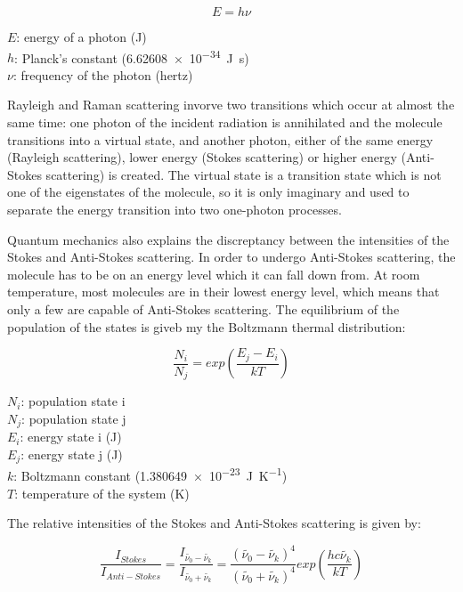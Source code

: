 \begin{equation}
    E = h \nu
\end{equation}

\( E\): energy of a photon (\unit{\joule})\\
\( h\): Planck's constant (\SI{6.62608e-34}{\joule\second})\\
\(\nu\): frequency of the photon (\unit{hertz})

\bigskip

Rayleigh and Raman scattering invorve two transitions which occur at almost the same time: one photon of the incident radiation is annihilated and the molecule transitions into a virtual state, and another photon, either of the same energy (Rayleigh scattering), lower energy (Stokes scattering) or higher energy (Anti-Stokes scattering) is created. The virtual state is a transition state which is not one of the eigenstates of the molecule, so it is only imaginary and used to separate the energy transition into two one-photon processes. 

\bigskip

Quantum mechanics also explains the discreptancy between 
 the intensities of the Stokes and Anti-Stokes scattering. In order to undergo Anti-Stokes scattering, the molecule has to be on an energy level which it can fall down from. At room temperature, most molecules are in their lowest energy level, which means that only a few are capable of Anti-Stokes scattering. The equilibrium of the population of the states is giveb my the Boltzmann thermal distribution:

 \begin{equation}
    \frac{N_i}{N_j} = exp \left( \frac{E_j-E_i}{kT}\right)
 \end{equation}

\(N_i\): population state i \\
\(N_j\): population state j \\
\(E_i\): energy state i (\unit{\joule})\\
\(E_j\): energy state j (\unit{\joule})\\
\(k\): Boltzmann constant (\SI{1.380649e-23}{\joule\per\kelvin})\\
\(T\): temperature of the system (\unit{\kelvin})

\bigskip

The relative intensities of the Stokes and Anti-Stokes scattering is given by:

\begin{equation}
    \frac{I_{Stokes}}{I_{Anti-Stokes}} = \frac{I_{\widetilde{\nu_0} - \widetilde{\nu_k}}}{I_{\widetilde{\nu_0} + \widetilde{\nu_k}}} = \frac{(\widetilde{\nu_0} - \widetilde{\nu_k})^4}{(\widetilde{\nu_0} + \widetilde{\nu_k})^4}exp \left( \frac{hc\widetilde{\nu_k}}{kT}\right)
 \end{equation}

